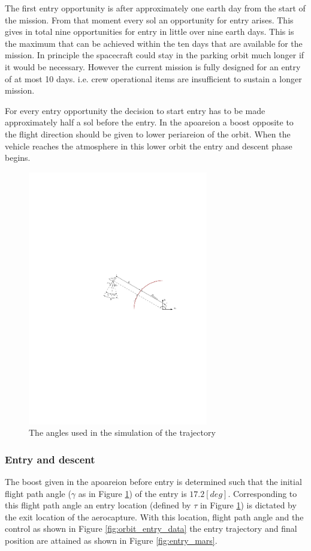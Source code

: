 The first entry opportunity is after approximately one earth day from the start of the mission. From that moment every sol an opportunity for entry arises. This gives in total nine opportunities for entry in little over nine earth days. This is the maximum that can be achieved within the ten days that are available for the mission. In principle the spacecraft could stay in the parking orbit much longer if it would be necessary. However the current mission is fully designed for an entry of at most 10 days. i.e. crew operational items are insufficient to sustain a longer mission.

For every entry opportunity the decision to start entry has to be made approximately half a sol before the entry. In the apoareion a boost opposite to the flight direction should be given to lower periareion of the orbit.  When the vehicle reaches the atmosphere in this lower orbit the entry and descent phase begins.

\begin{figure}[h]
	\centering
	\includegraphics[width=0.7\textwidth]{Figure/Orbit/angles.pdf}
	\caption{The angles used in the simulation of the trajectory}
	\label{fig:angles}
\end{figure}

\subsubsection{Entry and descent}\label{sec:entry_descent}
The boost given in the apoareion before entry is determined such that the initial flight path angle ($\gamma$ as in Figure \ref{fig:angles}) of the entry is $17.2 \left[deg\right]$. Corresponding to this flight path angle an entry location (defined by $\tau$ in Figure \ref{fig:angles}) is dictated by the exit location of the aerocapture. With this location, flight path angle and the control as shown in Figure \ref{fig:orbit_entry_data} the entry trajectory and final position are attained as shown in Figure \ref{fig:entry_mars}.

